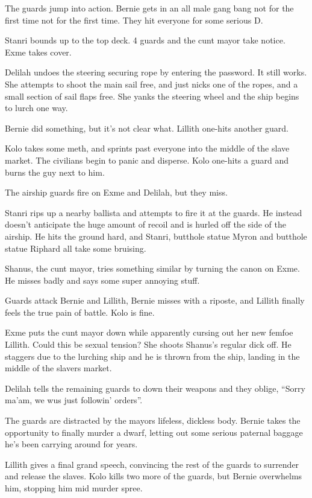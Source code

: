 The guards jump into action. Bernie gets in an all male gang bang not for the first time not for the first time. They hit everyone for some serious D.\medskip

Stanri bounds up to the top deck. 4 guards and the cunt mayor take notice. Exme takes cover.\medskip

Delilah undoes the steering securing rope by entering the password. It still works. She attempts to shoot the main sail free, and just nicks one of the ropes, and a small section of sail flaps free. She yanks the steering wheel and the ship begins to lurch one way.\medskip

Bernie did something, but it’s not clear what. Lillith one-hits another guard.\medskip

Kolo takes some meth, and sprints past everyone into the middle of the slave market. The civilians begin to panic and disperse. Kolo one-hits a guard and burns the guy next to him.\medskip

The airship guards fire on Exme and Delilah, but they miss.\medskip

Stanri rips up a nearby ballista and attempts to fire it at the guards. He instead doesn’t anticipate the huge amount of recoil and is hurled off the side of the airship. He hits the ground hard, and Stanri, butthole statue Myron and butthole statue Riphard all take some bruising.\medskip

Shanus, the cunt mayor, tries something similar by turning the canon on Exme. He misses badly and says some super annoying stuff.\medskip

Guards attack Bernie and Lillith, Bernie misses with a riposte, and Lillith finally feels the true pain of battle. Kolo is fine.\medskip

Exme puts the cunt mayor down while apparently cursing out her new femfoe Lillith. Could this be sexual tension? She shoots Shanus’s regular dick off. He staggers due to the lurching ship and he is thrown from the ship, landing in the middle of the slavers market.\medskip

Delilah tells the remaining guards to down their weapons and they oblige, “Sorry ma’am, we wus just followin’ orders”.\medskip

The guards are distracted by the mayors lifeless, dickless body. Bernie takes the opportunity to finally murder a dwarf, letting out some serious paternal baggage he’s been carrying around for years.\medskip

Lillith gives a final grand speech, convincing the rest of the guards to surrender and release the slaves. Kolo kills two more of the guards, but Bernie overwhelms him, stopping him mid murder spree.\medskip

